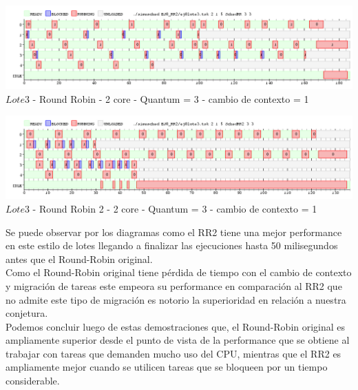    \begin{center}
    	\includegraphics[width=450pt]{./EJ8_RR2/dif5corerr.png}
	{$Lote 3$ - Round Robin - 2 core - Quantum = 3 - cambio de contexto = 1}	
 \end{center}
 
 \begin{center}
    	\includegraphics[width=450pt]{./EJ8_RR2/dif5corerr2.png}
	{$Lote 3$ - Round Robin 2 - 2 core - Quantum = 3 - cambio de contexto = 1}	
 \end{center}

 Se puede observar por los diagramas como el RR2 tiene una mejor performance en este estilo
 de lotes llegando a finalizar las ejecuciones hasta 50 milisegundos antes que el Round-Robin
 original.\\
 Como el Round-Robin original tiene pérdida de tiempo con el cambio de contexto y
 migración de tareas este empeora su performance en comparación al RR2 que no admite
 este tipo de migración es notorio la superioridad en relación a nuestra conjetura.\\
 
 Podemos concluir luego de estas demostraciones que, el Round-Robin original es ampliamente
 superior desde el punto de vista de la performance que se obtiene al trabajar con tareas
 que demanden mucho uso del CPU, mientras que el RR2 es ampliamente mejor cuando se utilicen
 tareas que se bloqueen por un tiempo considerable.\\
 

